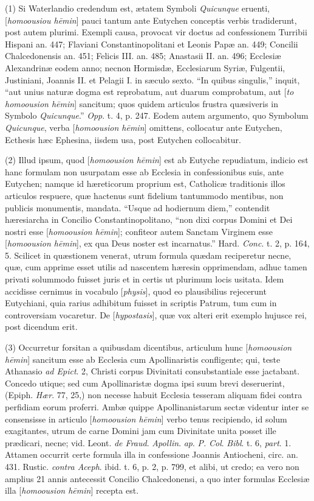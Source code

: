 (1) Si Waterlandio credendum est, ætatem Symboli
\emph{Quicunque} eruenti, [\emph{homoousiou h\={e}min}] pauci
tantum ante Eutychen conceptis verbis tradiderunt, post autem plurimi.
Exempli causa, provocat vir doctus ad confessionem Turribii Hispani
an. 447; Flaviani Constantinopolitani et Leonis Papæ an. 449;
Concilii Chalcedonensis an. 451; Felicis III. an. 485; Anastasii II.
an. 496; Ecclesiæ Alexandrinæ eodem anno; necnon Hormisdæ,
Ecclesiarum Syriæ, Fulgentii, Justiniani, Joannis II. et Pelagii I.
in sæculo sexto. ``In quibus singulis,'' inquit, ``aut unius naturæ
dogma est reprobatum, aut duarum comprobatum, aut [\emph{to homoousion h\={e}min}]
sancitum; quos quidem articulos frustra quæsiveris in Symbolo \emph{Quicunque}.''
\emph{Opp}. t. 4, p. 247. Eodem autem argumento, quo Symbolum \emph{Quicunque},
verba [\emph{homoousion h\={e}min}] omittens, collocatur ante
Eutychen, Ecthesis hæc Ephesina, iisdem usa, post Eutychen
collocabitur.

(2) Illud ipsum, quod [\emph{homoousion h\={e}min}]
est ab Eutyche repudiatum, indicio est hanc formulam non usurpatam
esse ab Ecclesia in confessionibus suis, ante Eutychen; namque id hæreticorum
proprium est, Catholicæ traditionis illos articulos respuere, quæ
hactenus sunt fidelium tantummodo mentibus, non publicis monumentis,
mandata. ``Usque ad hodiernum diem,'' contendit hæresiarcha in
Concilio Constantinopolitano, ``non dixi corpus Domini et Dei nostri
esse [\emph{homoousion h\={e}min}]; confiteor autem Sanctam
Virginem esse [\emph{homoousion h\={e}min}], ex qua Deus noster est
incarnatus.'' Hard. \emph{Conc}. t. 2, p. 164, 5. Scilicet in quæstionem
venerat, utrum formula quædam reciperetur necne, quæ, cum apprime
esset utilis ad nascentem hæresin opprimendam, adhuc tamen privati
solummodo fuisset juris et in certis ut plurimum locis usitata. Idem
accidisse cernimus in vocabulo [\emph{physis}], quod eo plausibilius
rejecerunt Eutychiani, quia rarius adhibitum fuisset in scriptis
Patrum, tum cum in controversiam vocaretur. De [\emph{hypostasis}], quæ
vox alteri erit exemplo hujusce rei, post dicendum erit.

(3) Occurretur forsitan a quibusdam dicentibus,
articulum hunc [\emph{homoousion h\={e}min}] sancitum esse ab
Ecclesia cum Apollinaristis confligente; qui, teste Athanasio \emph{ad
Epict}. 2, Christi corpus Divinitati consubstantiale esse jactabant.
Concedo utique; sed cum Apollinaristæ dogma ipsi suum brevi
deseruerint, (Epiph. \emph{Hær}. 77, 25,) non necesse habuit Ecclesia
tesseram aliquam fidei contra perfidiam eorum proferri. Ambæ quippe
Apollinanistarum sectæ videntur inter se consensisse in articulo [\emph{homoousion
h\={e}min}] verbo tenus recipiendo, id solum exagitantes, utrum
de carne Domini jam cum Divinitate unita posset ille prædicari, necne;
vid. Leont. \emph{de Fraud}. \emph{Apollin}. \emph{ap}. \emph{P.} \emph{Col}.
\emph{Bibl}. t. 6, \emph{part}. 1. Attamen occurrit certe formula illa
in confessione Joannis Antiocheni, circ. an. 431. Rustic. \emph{contra
Aceph}. ibid. t. 6, p. 2, p. 799, et alibi, ut credo; ea vero non
amplius 21 annis antecessit Concilio Chalcedonensi, a quo inter
formulas Ecclesiæ illa [\emph{homoousion h\={e}min}] recepta est.

